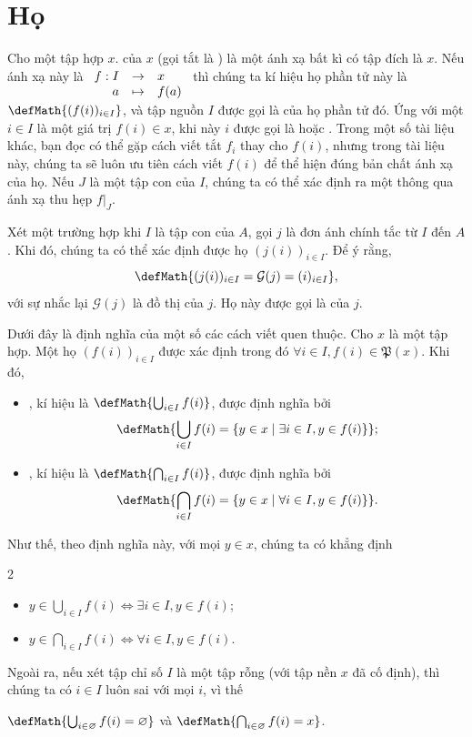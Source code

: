 \section{Họ}

Cho một tập hợp $x$.  của $x$ (gọi tắt là ) là một ánh xạ bất kì có tập đích là $x$. Nếu ánh xạ này là $\begin{array}[t]{rcl}  
f: I & \to & x\\       
   a & \mapsto & f(a) 
\end{array}$ thì chúng ta kí hiệu họ phần tử này là $\defMath{(f(i))_{i \in I}}$, và tập nguồn $I$ được gọi là  của họ phần tử đó. Ứng với một $i \in I$ là một giá trị $f(i) \in x$, khi này $i$ được gọi là  hoặc . Trong một số tài liệu khác, bạn đọc có thể gặp cách viết tắt $f_i$ thay cho $f(i)$, nhưng trong tài liệu này, chúng ta sẽ luôn ưu tiên cách viết $f(i)$ để thể hiện đúng bản chất ánh xạ của họ. Nếu $J$ là một tập con của $I$, chúng ta có thể xác định ra một  thông qua ánh xạ thu hẹp $f|_J$. 

Xét một trường hợp khi $I$ là tập con của $A$, gọi $j$ là đơn ánh chính tắc từ $I$ đến $A$. Khi đó, chúng ta có thể xác định được họ $(j(i))_{i \in I}$. Để ý rằng,
\begin{equation*}
   \defMath{(j(i))_{i \in I} = \mathcal{G}(j) = (i)_{i \in I}},
\end{equation*}
với sự nhắc lại $\mathcal{G}(j)$ là đồ thị của $j$. Họ này được gọi là  của $j$.

Dưới đây là định nghĩa của một số các cách viết quen thuộc. Cho $x$ là một tập hợp. Một họ $(f(i))_{i \in I}$ được xác định trong đó $\forall i \in I, f(i) \in \mathfrak{P}(x)$. Khi đó, \begin{itemize}
   \item {}, kí hiệu là $\defMath{\bigcup_{i \in I}f(i)}$, được định nghĩa bởi $$
   \defMath{\bigcup_{i \in I}f(i) = \{y \in x \mid \exists i \in I, y \in f(i)\}};
   $$
   \item {}, kí hiệu là $\defMath{\bigcap_{i \in I}f(i)}$, được định nghĩa bởi $$
   \defMath{\bigcap_{i \in I}f(i) = \{y \in x \mid \forall i \in I, y \in f(i)\}}.$$
\end{itemize}
Như thế, theo định nghĩa này, với mọi $y \in x$, chúng ta có khẳng định
\begin{multicols}{2}
   \begin{itemize}
      \item $y \in \bigcup_{i \in I}f(i) \iff \exists i \in I, y \in f(i)$;
      \item $y \in \bigcap_{i \in I}f(i) \iff \forall i \in I, y \in f(i)$.
   \end{itemize}
\end{multicols}
\noindent Ngoài ra, nếu xét tập chỉ số $I$ là một tập rỗng (với tập nền $x$ đã cố định), thì chúng ta có $i \in I$ luôn sai với mọi $i$, vì thế 
\begin{center}
   $\defMath{\bigcup_{i \in \varnothing}f(i) = \varnothing}$ và $\defMath{\bigcap_{i \in \varnothing}f(i) = x}$.
\end{center}


